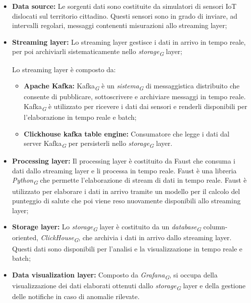 \begin{itemize}
    \item \textbf{Data source:} Le sorgenti dati sono costituite da simulatori di sensori IoT dislocati sul territorio cittadino. Questi sensori sono in grado di inviare, ad intervalli regolari, messaggi contenenti misurazioni allo streaming layer;
    
    \item \textbf{Streaming layer:} Lo streaming layer gestisce i dati in arrivo in tempo reale, per poi archiviarli sistematicamente nello \textit{storage}\textsubscript{\textit{G}} layer;
    
    Lo streaming layer è composto da:
    \begin{itemize}
        \item \textbf{Apache Kafka:} Kafka\textsubscript{\textit{G}} è un \textit{sistema}\textsubscript{\textit{G}} di messaggistica distribuito che consente di pubblicare, sottoscrivere e archiviare messaggi in tempo reale. Kafka\textsubscript{\textit{G}} è utilizzato per ricevere i dati dai sensori e renderli disponibili per l'elaborazione in tempo reale e batch;
        
        \item \textbf{Clickhouse kafka table engine:} Consumatore che legge i dati dal server Kafka\textsubscript{\textit{G}} per persisterli nello \textit{storage}\textsubscript{\textit{G}} layer.
    \end{itemize}

    \item \textbf{Processing layer:} Il processing layer è costituito da Faust che consuma i dati dallo streaming layer e li processa in tempo reale. Faust è una libreria \textit{Python}\textsubscript{\textit{G}} che permette l'elaborazione di stream di dati in tempo reale. Faust è utilizzato per elaborare i dati in arrivo tramite un modello per il calcolo del punteggio di salute che poi viene reso nuovamente disponibili allo streaming layer;
    
    \item \textbf{Storage layer:} Lo \textit{storage}\textsubscript{\textit{G}} layer è costituito da un \textit{database}\textsubscript{\textit{G}} column-oriented, \textit{ClickHouse}\textsubscript{\textit{G}}, che archivia i dati in arrivo dallo streaming layer. Questi dati sono disponibili per l'analisi e la visualizzazione in tempo reale e batch;
    
    \item \textbf{Data visualization layer:} Composto da \textit{Grafana}\textsubscript{\textit{G}}, si occupa della visualizzazione dei dati elaborati ottenuti dallo \textit{storage}\textsubscript{\textit{G}} layer e della gestione delle notifiche in caso di anomalie rilevate.
\end{itemize}